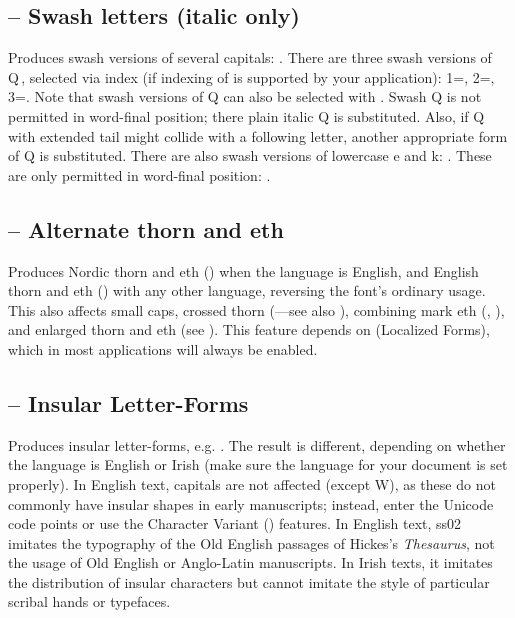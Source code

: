 \subsection{ – Swash letters (italic only)}
Produces swash versions of several capitals: . There are three swash
versions of Q\,, selected via index (if indexing of  is supported by your
application): 1=,
2=, 3=.
Note that swash versions of Q can also be selected with . Swash Q is not permitted in
word-final position; there plain italic Q is substituted. Also, if Q with extended tail might collide with
a following letter, another appropriate form of Q is substituted. There are also swash versions of lowercase
e and k: . These are only permitted in word-final position:
.

\subsection{ – Alternate thorn and eth}
Produces Nordic thorn and eth ()
when the language is English, and English thorn and eth
() with any other language,
reversing the font’s ordinary usage.
This also affects small caps, crossed
thorn (—see also
\hyperlink{OtherLatin}{}), combining mark eth
(, ), and enlarged thorn and eth
(see ).
This feature depends on  (Localized Forms), which in most applications will
always be enabled.

\subsection{ – Insular Letter-Forms}
Produces insular letter-forms, e.g. .
The result is different,
depending on whether the language is English or Irish (make sure the language for your document is set
properly). In English text, capitals are not affected (except W), as these do not commonly have
insular shapes in early manuscripts; instead, enter the Unicode code points or use the Character Variant
() features. In English text, ss02 imitates the typography of the Old English
passages of Hickes’s \textit{Thesaurus}, not the usage of Old English or Anglo-Latin manuscripts. In
Irish texts, it imitates the distribution of insular characters but cannot imitate the style of
particular scribal hands or typefaces.

